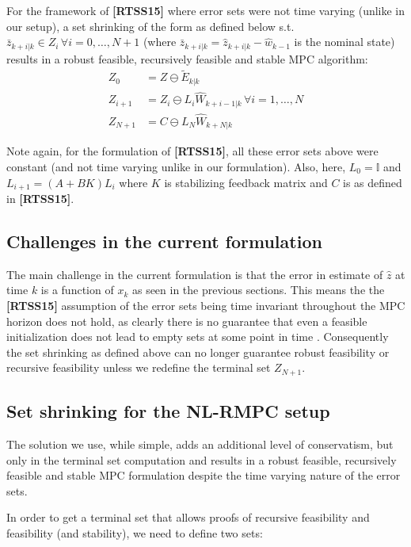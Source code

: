 \documentclass{article}[14pt]
\begin{document}
For the framework of \textbf{[RTSS15]} where error sets were not time varying (unlike in our setup), a set shrinking of the form as defined below s.t. $\bar{z}_{k+i|k}\in Z_{i}\,\forall i=0,\dotsc,N+1$ (where $\bar{z}_{k+i|k}=\hat{z}_{k+i|k}-\hat{w}_{k-1}$ is the nominal state) results in a robust feasible, recursively feasible and stable MPC algorithm:
\begin{subequations}
\label{eq:set_RTSS}
\begin{align}
Z_0&=Z\ominus\tilde{E}_{k|k} \\
Z_{i+1}&=Z_i\ominus L_i\hat{W}_{k+i-1|k}\,\forall i=1,\dotsc,N \\
Z_{N+1}&=C\ominus L_N\hat{W}_{k+N|k}
\end{align}
\end{subequations}

Note again, for the formulation of \textbf{[RTSS15]}, all these error sets above were constant (and not time varying unlike in our formulation). Also, here, $L_0=\mathbb{I}$ and $L_{i+1}=(A+BK)L_i$ where $K$ is stabilizing feedback matrix and $C$ is as defined in \textbf{[RTSS15]}.

\subsection{Challenges in the current formulation}
The main challenge in the current formulation is that the error in estimate of $\hat{z}$ at time $k$ is a function of $x_k$ as seen in the previous sections. This means the the \textbf{[RTSS15]} assumption of the error sets being time invariant throughout the MPC horizon does not hold, as clearly there is no guarantee that even a feasible initialization does not lead to empty sets at some point in time . Consequently the set shrinking as defined above can no longer guarantee robust feasibility or recursive feasibility unless we redefine the terminal set $Z_{N+1}$.

\subsection{Set shrinking for the NL-RMPC setup}
The solution we use, while simple, adds an additional level of conservatism, but only in the terminal set computation and results in a robust feasible, recursively feasible and stable MPC formulation despite the time varying nature of the error sets. 

In order to get a terminal set that allows proofs of recursive feasibility and feasibility (and stability), we need to define two sets:
\end{document}
